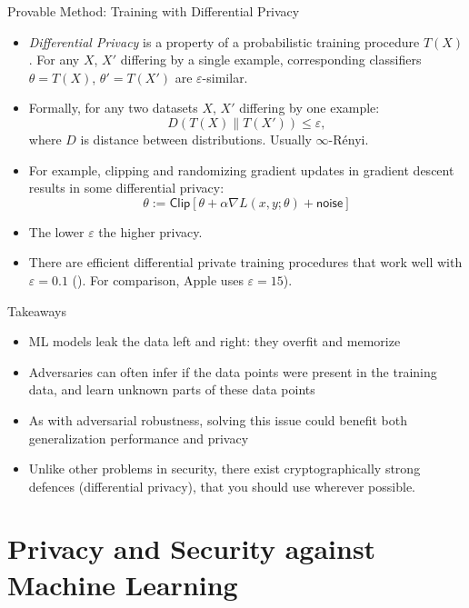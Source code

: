 \documentclass[10pt]{beamer}
\begin{document}
\begin{frame}{Provable Method: Training with Differential Privacy}
  \begin{itemize}[<+-| alert@+>]
    \item \emph{Differential Privacy} is a property of a probabilistic training procedure $T(X)$.
      For any $X$, $X'$ differing by a single example, corresponding classifiers $\theta = T(X)$,
      $\theta' = T(X')$ are $\varepsilon$-similar.
    \item Formally, for any two datasets $X$, $X'$ differing by one example:
      \[
        D(T(X) \parallel T(X') ) \leq \varepsilon,
      \]
      where $D$ is distance between distributions. Usually $\infty$-R\'enyi.
    \item For example, clipping and randomizing gradient updates in gradient descent results in some
      differential privacy:
      \[
        \theta := \textsf{Clip} \left[ \theta + \alpha \nabla L(x, y; \theta) + \textsf{noise}\right]
      \]
    \item The lower $\varepsilon$ the higher privacy.
    \item There are efficient differential private training procedures that work well with
      $\varepsilon = 0.1$ (\cite{IyengarNSTTW19}). For comparison, Apple uses $\varepsilon = 15$).
  \end{itemize}
\end{frame}

\begin{frame}{Takeaways}
  \begin{itemize}[<+-| alert@+>]
    \item ML models leak the data left and right: they overfit and memorize
    \item Adversaries can often infer if the data points were present in the training data, and
      learn unknown parts of these data points
    \item As with adversarial robustness, solving this issue could benefit both generalization
      performance and privacy
    \item Unlike other problems in security, there exist cryptographically strong defences
      (differential privacy), that you should use wherever possible.
  \end{itemize}
\end{frame}


\section{Privacy and Security against Machine Learning}
\end{document}
